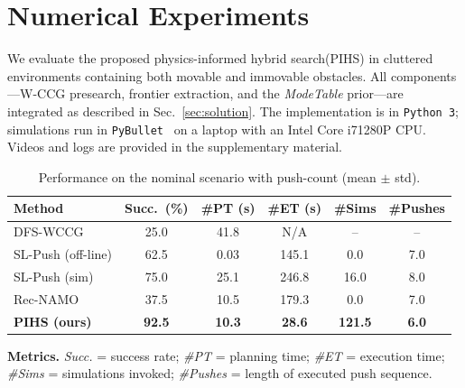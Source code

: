 \section{Numerical Experiments}
\label{sec:experiments}
We evaluate the proposed physics-informed hybrid search(PIHS)
in cluttered environments containing both movable 
and immovable obstacles. All components—W-CCG presearch, frontier extraction, 
and the \textit{ModeTable} prior—are integrated as described in Sec.~\ref{sec:solution}. 
The implementation is in \texttt{Python~3}; 
simulations run in \texttt{PyBullet}~\cite{coumans2019} on a laptop with an Intel Core i7\textendash1280P CPU. 
Videos and logs are provided in the supplementary material.




\begin{table}[t]
  \centering
\begin{threeparttable}
  \caption{Performance on the nominal scenario with push-count (mean $\pm$ std).}
  \label{tab:main}
  \vspace{2pt}
  \setlength{\tabcolsep}{2.3pt}
\begin{tabular}{lccccc}
\toprule
Method & Succ.~(\%) & \#PT (s) & \#ET (s) & \#Sims & \#Pushes \\
\midrule
DFS-WCCG            & 25.0  & 41.8  & N/A     & --    & --   \\
SL-Push (off-line)  & 62.5  & 0.03  & 145.1   & 0.0   & 7.0  \\
SL-Push (sim)       & 75.0  & 25.1  & 246.8   & 16.0  & 8.0  \\
Rec-NAMO            & 37.5  & 10.5  & 179.3   & 0.0   & 7.0  \\
\textbf{PIHS (ours)}& \textbf{92.5} & \textbf{10.3} & \textbf{28.6} & \textbf{121.5} & \textbf{6.0} \\
\bottomrule
\end{tabular}
  \begin{tablenotes}[flushleft]\footnotesize
  \item \textbf{Metrics.} \emph{Succ.} = success rate; \emph{\#PT} = planning time; \emph{\#ET} = execution time; \emph{\#Sims} = simulations invoked; \emph{\#Pushes} = length of executed push sequence.
  \end{tablenotes}
  \end{threeparttable}
  \vspace{-4mm}
\end{table}

